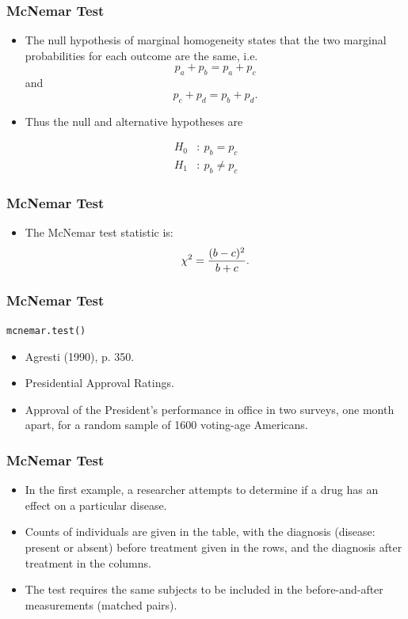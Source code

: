 \documentclass{beamer}
\begin{document}
\begin{frame}
\frametitle{McNemar Test}
\Large
\begin{itemize}
\item The null hypothesis of marginal homogeneity states that the two marginal probabilities for each outcome are the same, i.e. \[p_a + p_b = p_a + p_c\] and \[p_c + p_d = p_b + p_d.\]
\item Thus the null and alternative hypotheses are
\end{itemize}
\begin{align}
H_0 & :~p_b=p_c \\
H_1 & :~p_b \ne p_c
\end{align}


\end{frame}
\begin{frame}
\frametitle{McNemar Test}
\Large
\begin{itemize}
\item The McNemar test statistic is:
\[\chi^2 = {(b-c)^2 \over b+c}.\]

\end{itemize}




\end{frame}
\begin{frame}[fragile]
\frametitle{McNemar Test}
\Large
\texttt{mcnemar.test() }
\begin{itemize}
\item Agresti (1990), p. 350.
\item Presidential Approval Ratings.
\item Approval of the President's performance in office in two surveys,
one month apart, for a random sample of 1600 voting-age Americans.
\end{itemize}

\end{frame}
\begin{frame}
\frametitle{McNemar Test}
\Large
\begin{itemize}
\item In the first example, a researcher attempts to determine if a drug has an effect on a particular disease. 
\item Counts of individuals are given in the table, with the diagnosis (disease: present or absent) before treatment given in the rows, and the diagnosis after treatment in the columns. 
\item The test requires the same subjects to be included in the before-and-after measurements (matched pairs).
\end{itemize}


\end{frame}
\end{document}
